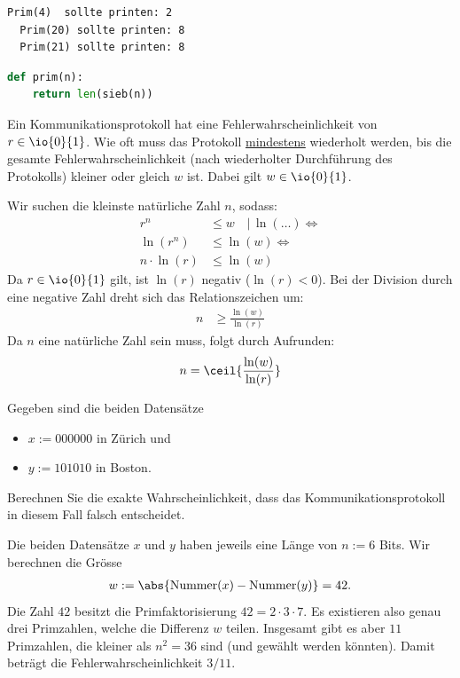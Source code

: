 \begin{questions}
\begin{lstlisting}[numbers=none]
  Prim(4)  sollte printen: 2
  Prim(20) sollte printen: 8
  Prim(21) sollte printen: 8
\end{lstlisting}
	\begin{solution}
		\begin{lstlisting}[language=Python,caption=Prim,numbers=none]
def prim(n):
    return len(sieb(n))
\end{lstlisting}
	\end{solution}

	\question[3]

	Ein Kommunikationsprotokoll hat eine Fehlerwahrscheinlichkeit von $r\in\io{0}{1}$. Wie oft muss das Protokoll \underline{mindestens} wiederholt werden, bis die gesamte Fehlerwahrscheinlichkeit (nach wiederholter Durchführung des Protokolls) kleiner oder gleich $w$ ist. Dabei gilt $w\in\io{0}{1}$.
	\begin{solution}
		Wir suchen die kleinste natürliche Zahl $n$, sodass:
		\begin{align*}
			r^n         & \leq w \quad \Big| \, \ln(\dots) \iff \tag{Logarithmieren} \\
			\ln(r^n)    & \leq \ln(w) \iff \\
			n \cdot \ln(r) & \leq \ln(w)
		\end{align*}
		Da $r \in \io{0}{1}$ gilt, ist $\ln(r)$ negativ ($\ln(r) < 0$). Bei der Division durch eine negative Zahl dreht sich das Relationszeichen um:
		\begin{align*}
			n & \geq \frac{\ln(w)}{\ln(r)}
		\end{align*}
		Da $n$ eine natürliche Zahl sein muss, folgt durch Aufrunden:
		\begin{align*}
			n = \ceil{\frac{\ln(w)}{\ln(r)}}
		\end{align*}
	\end{solution}

	\question[3] Gegeben sind die beiden Datensätze
	\begin{itemize}
		\item $x := 000000$ in Zürich und
		\item $y := 101010$ in Boston.
	\end{itemize}
	Berechnen Sie die exakte Wahrscheinlichkeit, dass das Kommunikationsprotokoll in diesem Fall falsch entscheidet.
	\begin{solution}
		Die beiden Datensätze $x$ und $y$ haben jeweils eine Länge von $n := 6$ Bits.
		Wir berechnen die Grösse
		\begin{align*}
			w := \abs{\text{Nummer}(x) - \text{Nummer}(y)} = 42.
		\end{align*}
		Die Zahl $42$ besitzt die Primfaktorisierung $42 = 2\cdot 3\cdot 7$. Es existieren also genau drei Primzahlen, welche die Differenz $w$ teilen. Insgesamt gibt es aber $11$ Primzahlen, die kleiner als $n^2 = 36$ sind (und gewählt werden könnten). Damit beträgt die Fehlerwahrscheinlichkeit $3/11$.
	\end{solution}


\end{questions}
